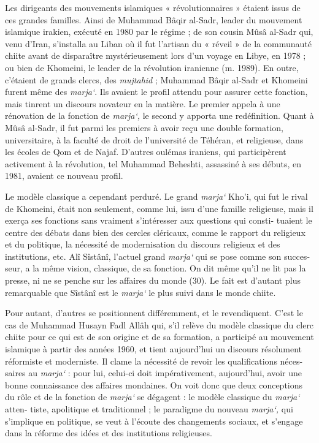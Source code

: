 Les dirigeants des mouvements islamiques « révolutionnaires » étaient
issus de ces grandes familles. Ainsi de Muhammad Bâqir al-Sadr, leader
du mouvement islamique irakien, exécuté en 1980 par le régime ; de son
cousin Mûsâ al-Sadr qui, venu d'Iran, s'installa au Liban où il fut
l'artisan du « réveil » de la communauté chiite avant de disparaître
mystérieusement lors d'un voyage en Libye, en 1978 ; ou bien de
Khomeini, le leader de la révolution iranienne (m. 1989). En outre,
c'étaient de grands clercs, des \emph{mujtahid} ; Muhammad Bâqir al-Sadr
et Khomeini furent même des \emph{marja`}. Ils avaient le profil attendu
pour assurer cette fonction, mais tinrent un discours novateur en la
matière. Le premier appela à une rénovation de la fonction de
\emph{marja`,} le second y apporta une redéfinition. Quant à Mûsâ
al-Sadr, il fut parmi les premiers à avoir reçu une double formation,
universitaire, à la faculté de droit de l'université de Téhéran, et
religieuse, dans les écoles de Qom et de Najaf. D'autres oulémas
iraniens, qui participèrent activement à la révolution, tel Muhammad
Beheshti, assassiné à ses débuts, en 1981, avaient ce nouveau profil.

Le modèle classique a cependant perduré. Le grand \emph{marja`} Kho'i,
qui fut le rival de Khomeini, était non seulement, comme lui, issu d'une
famille religieuse, mais il exerça ses fonctions sans vraiment
s'intéresser aux questions qui consti- tuaient le centre des débats dans
bien des cercles cléricaux, comme le rapport du religieux et du
politique, la nécessité de modernisation du discours religieux et des
institutions, etc. Alî Sîstânî, l'actuel grand \emph{marja`} qui se pose
comme son succes- seur, a la même vision, classique, de sa fonction. On
dit même qu'il ne lit pas la presse, ni ne se penche sur les affaires du
monde (30). Le fait est d'autant plus remarquable que Sîstânî est le
\emph{marja`} le plus suivi dans le monde chiite.

Pour autant, d'autres se positionnent différemment, et le revendiquent.
C'est le cas de Muhammad Husayn Fadl Allâh qui, s'il relève du modèle
classique du clerc chiite pour ce qui est de son origine et de sa
formation, a participé au mouvement islamique à partir des années 1960,
et tient aujourd'hui un discours résolument réformiste et moderniste. Il
clame la nécessité de revoir les qualifications néces- saires au
\emph{marja`} : pour lui, celui-ci doit impérativement, aujourd'hui,
avoir une bonne connaissance des affaires mondaines. On voit donc que
deux conceptions du rôle et de la fonction de \emph{marja`} se dégagent
: le modèle classique du \emph{marja`} atten- tiste, apolitique et
traditionnel ; le paradigme du nouveau \emph{marja`,} qui s'implique en
politique, se veut à l'écoute des changements sociaux, et s'engage dans
la réforme des idées et des institutions religieuses.

